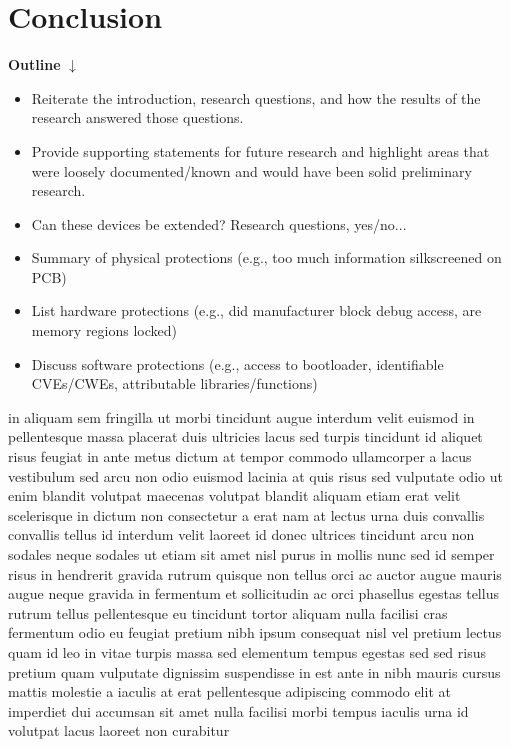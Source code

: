 \section{Conclusion}

\textbf{Outline}
$\downarrow$

\begin{itemize}
    \item Reiterate the introduction, research questions, and how the results of the research answered those questions.
    \item Provide supporting statements for future research and highlight areas that were loosely documented/known and would have been solid preliminary research.
    \item Can these devices be extended? Research questions, yes/no...
\end{itemize}

\begin{itemize}
    \item Summary of physical protections (e.g., too much information silkscreened on PCB)
    \item List hardware protections (e.g., did manufacturer block debug access, are memory regions locked)
    \item Discuss software protections (e.g., access to bootloader, identifiable CVEs/CWEs, attributable libraries/functions)
\end{itemize}

in aliquam sem fringilla ut morbi tincidunt augue interdum velit euismod in pellentesque massa placerat duis ultricies lacus sed turpis tincidunt id aliquet risus feugiat in ante metus dictum at tempor commodo ullamcorper a lacus vestibulum sed arcu non odio euismod lacinia at quis risus sed vulputate odio ut enim blandit volutpat maecenas volutpat blandit aliquam etiam erat velit scelerisque in dictum non consectetur a erat nam at lectus urna duis convallis convallis tellus id interdum velit laoreet id donec ultrices tincidunt arcu non sodales neque sodales ut etiam sit amet nisl purus in mollis nunc sed id semper risus in hendrerit gravida rutrum quisque non tellus orci ac auctor augue mauris augue neque gravida in fermentum et sollicitudin ac orci phasellus egestas tellus rutrum tellus pellentesque eu tincidunt tortor aliquam nulla facilisi cras fermentum odio eu feugiat pretium nibh ipsum consequat nisl vel pretium lectus quam id leo in vitae turpis massa sed elementum tempus egestas sed sed risus pretium quam vulputate dignissim suspendisse in est ante in nibh mauris cursus mattis molestie a iaculis at erat pellentesque adipiscing commodo elit at imperdiet dui accumsan sit amet nulla facilisi morbi tempus iaculis urna id volutpat lacus laoreet non curabitur
